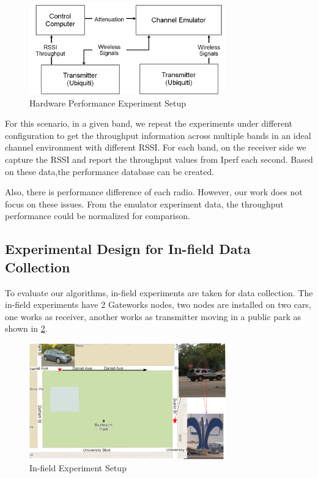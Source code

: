 \begin{figure}
\centering
\includegraphics[width=85mm]{figure/emulator2}
\caption{Hardware Performance Experiment Setup}
\label{fig:in-door experiment}
\end{figure}

For this scenario, in a given band, we repeat the experiments under different configuration to get the throughput information across multiple bands in an ideal channel environment with different RSSI.
For each band, on the receiver side we capture the RSSI and report the throughput values from Iperf \cite{Iperf} each second. Based on these data,the performance database can be created.

Also, there is performance difference of each radio. However, our work does not focus on these issues. From the emulator experiment data, the throughput performance could be normalized for comparison. 


\subsection{Experimental Design for In-field Data Collection}

To evaluate our algorithms, in-field experiments are taken for data collection.
The in-field experiments have 2 Gateworks nodes, two nodes are installed on two cars, one works as receiver, another works as transmitter moving in a public park as shown in \ref{fig:infield}.

\begin{figure}
\centering
\includegraphics[width=85mm]{figure/infield}
\caption{In-field Experiment Setup}
\label{fig:infield}
\end{figure}


